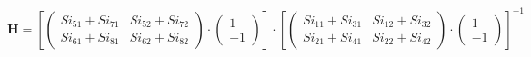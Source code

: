 \[ \mathbf{H} = \left[ \left(\begin{smallmatrix} Si_{51} + Si_{71} &
Si_{52} + Si_{72} \\ Si_{61} + Si_{81} & Si_{62} + Si_{82}
\end{smallmatrix}\right)\cdot \left(\begin{smallmatrix} 1 \\ -1
\end{smallmatrix}\right)\right]\cdot\left[ \left(\begin{smallmatrix}
Si_{11} + Si_{31} & Si_{12} + Si_{32} \\ Si_{21} + Si_{41} & Si_{22} +
Si_{42} \end{smallmatrix}\right)\cdot \left(\begin{smallmatrix} 1 \\
-1 \end{smallmatrix}\right)\right]^{-1} \]
